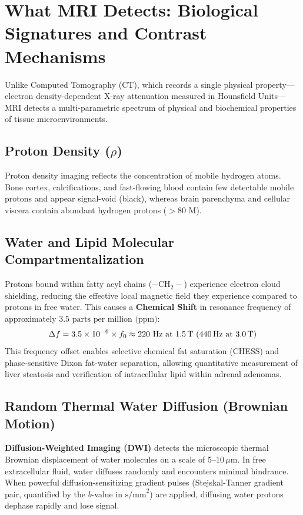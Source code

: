 \documentclass[11pt,a4paper]{article}
\begin{document}
\section{What MRI Detects: Biological Signatures and Contrast Mechanisms}

Unlike Computed Tomography (CT), which records a single physical property—electron density-dependent X-ray attenuation measured in Hounsfield Units—MRI detects a multi-parametric spectrum of physical and biochemical properties of tissue microenvironments.

\subsection{Proton Density ($\rho$)}
Proton density imaging reflects the concentration of mobile hydrogen atoms. Bone cortex, calcifications, and fast-flowing blood contain few detectable mobile protons and appear signal-void (black), whereas brain parenchyma and cellular viscera contain abundant hydrogen protons ($>80\text{ M}$).

\subsection{Water and Lipid Molecular Compartmentalization}
Protons bound within fatty acyl chains ($-\text{CH}_2-$) experience electron cloud shielding, reducing the effective local magnetic field they experience compared to protons in free water. This causes a \textbf{Chemical Shift} in resonance frequency of approximately $3.5\text{ parts per million (ppm)}$:
\begin{equation}
    \Delta f = 3.5 \times 10^{-6} \times f_0 \approx 220\text{ Hz at 1.5\,T (440\,Hz at 3.0\,T)}
\end{equation}
This frequency offset enables selective chemical fat saturation (CHESS) and phase-sensitive Dixon fat-water separation, allowing quantitative measurement of liver steatosis and verification of intracellular lipid within adrenal adenomas.

\subsection{Random Thermal Water Diffusion (Brownian Motion)}
\textbf{Diffusion-Weighted Imaging (DWI)} detects the microscopic thermal Brownian displacement of water molecules on a scale of 5--10\,$\mu\text{m}$. In free extracellular fluid, water diffuses randomly and encounters minimal hindrance. When powerful diffusion-sensitizing gradient pulses (Stejskal-Tanner gradient pair, quantified by the $b$-value in $\text{s/mm}^2$) are applied, diffusing water protons dephase rapidly and lose signal.
\end{document}
